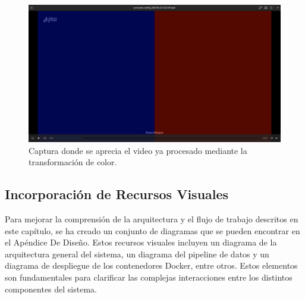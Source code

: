\begin{figure}[H]
    \centering
    \includegraphics[width=\textwidth]{img/resultado-procesamiento.png}
    \caption{Captura donde se aprecia el video ya procesado mediante la transformación de color.}
    \label{fig:Captura video ya procesado}
\end{figure}

\subsection{Incorporación de Recursos Visuales}
Para mejorar la comprensión de la arquitectura y el flujo de trabajo descritos en este capítulo, se ha creado un conjunto de diagramas que se pueden encontrar en el Apéndice De Diseño. Estos recursos visuales incluyen un diagrama de la arquitectura general del sistema, un diagrama del pipeline de datos y un diagrama de despliegue de los contenedores Docker, entre otros. Estos elementos son fundamentales para clarificar las complejas interacciones entre los distintos componentes del sistema.